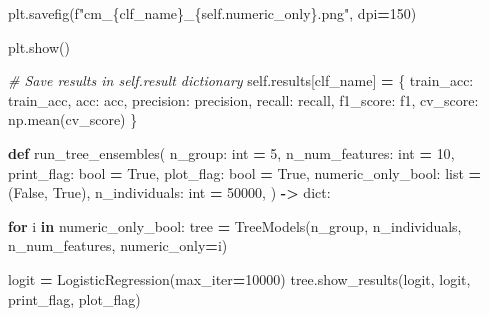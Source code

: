 \documentclass[
]{book}
\newenvironment{Shaded}{\begin{snugshade}}{\end{snugshade}}
\newcommand{\BuiltInTok}[1]{#1}
\newcommand{\CommentTok}[1]{\textcolor[rgb]{0.56,0.35,0.01}{\textit{#1}}}
\newcommand{\ControlFlowTok}[1]{\textcolor[rgb]{0.13,0.29,0.53}{\textbf{#1}}}
\newcommand{\DecValTok}[1]{\textcolor[rgb]{0.00,0.00,0.81}{#1}}
\newcommand{\KeywordTok}[1]{\textcolor[rgb]{0.13,0.29,0.53}{\textbf{#1}}}
\newcommand{\NormalTok}[1]{#1}
\newcommand{\OperatorTok}[1]{\textcolor[rgb]{0.81,0.36,0.00}{\textbf{#1}}}
\newcommand{\SpecialCharTok}[1]{\textcolor[rgb]{0.00,0.00,0.00}{#1}}
\newcommand{\SpecialStringTok}[1]{\textcolor[rgb]{0.31,0.60,0.02}{#1}}
\newcommand{\StringTok}[1]{\textcolor[rgb]{0.31,0.60,0.02}{#1}}
\newcommand{\VariableTok}[1]{\textcolor[rgb]{0.00,0.00,0.00}{#1}}
\theoremstyle{definition}
\theoremstyle{definition}
\theoremstyle{definition}
\theoremstyle{definition}
\theoremstyle{remark}
\begin{document}
\begin{Shaded}
\begin{Highlighting}[]
\NormalTok{            plt.savefig(}\SpecialStringTok{f"cm\_}\SpecialCharTok{\{}\NormalTok{clf\_name}\SpecialCharTok{\}}\SpecialStringTok{\_}\SpecialCharTok{\{}\VariableTok{self}\SpecialCharTok{.}\NormalTok{numeric\_only}\SpecialCharTok{\}}\SpecialStringTok{.png"}\NormalTok{, dpi}\OperatorTok{=}\DecValTok{150}\NormalTok{)}

\NormalTok{        plt.show()}

        \CommentTok{\# Save results in self.result dictionary}
        \VariableTok{self}\NormalTok{.results[clf\_name] }\OperatorTok{=}\NormalTok{ \{}
            \StringTok{\textquotesingle{}train\_acc\textquotesingle{}}\NormalTok{: train\_acc,}
            \StringTok{\textquotesingle{}acc\textquotesingle{}}\NormalTok{: acc,}
            \StringTok{\textquotesingle{}precision\textquotesingle{}}\NormalTok{: precision,}
            \StringTok{\textquotesingle{}recall\textquotesingle{}}\NormalTok{: recall,}
            \StringTok{\textquotesingle{}f1\_score\textquotesingle{}}\NormalTok{: f1,}
            \StringTok{\textquotesingle{}cv\_score\textquotesingle{}}\NormalTok{: np.mean(cv\_score)}
\NormalTok{        \}}


\KeywordTok{def}\NormalTok{ run\_tree\_ensembles(}
\NormalTok{        n\_group: }\BuiltInTok{int} \OperatorTok{=} \DecValTok{5}\NormalTok{,}
\NormalTok{        n\_num\_features: }\BuiltInTok{int} \OperatorTok{=} \DecValTok{10}\NormalTok{,}
\NormalTok{        print\_flag: }\BuiltInTok{bool} \OperatorTok{=} \VariableTok{True}\NormalTok{,}
\NormalTok{        plot\_flag: }\BuiltInTok{bool} \OperatorTok{=} \VariableTok{True}\NormalTok{,}
\NormalTok{        numeric\_only\_bool: }\BuiltInTok{list} \OperatorTok{=}\NormalTok{ (}\VariableTok{False}\NormalTok{, }\VariableTok{True}\NormalTok{),}
\NormalTok{        n\_individuals: }\BuiltInTok{int} \OperatorTok{=} \DecValTok{50000}\NormalTok{,}
\NormalTok{) }\OperatorTok{{-}\textgreater{}} \BuiltInTok{dict}\NormalTok{:}

    \ControlFlowTok{for}\NormalTok{ i }\KeywordTok{in}\NormalTok{ numeric\_only\_bool:}
\NormalTok{        tree }\OperatorTok{=}\NormalTok{ TreeModels(n\_group, n\_individuals, n\_num\_features, numeric\_only}\OperatorTok{=}\NormalTok{i)}

\NormalTok{        logit }\OperatorTok{=}\NormalTok{ LogisticRegression(max\_iter}\OperatorTok{=}\DecValTok{10000}\NormalTok{)}
\NormalTok{        tree.show\_results(logit, }\StringTok{\textquotesingle{}logit\textquotesingle{}}\NormalTok{, print\_flag, plot\_flag)}


\end{Highlighting}
\end{Shaded}
\end{document}
